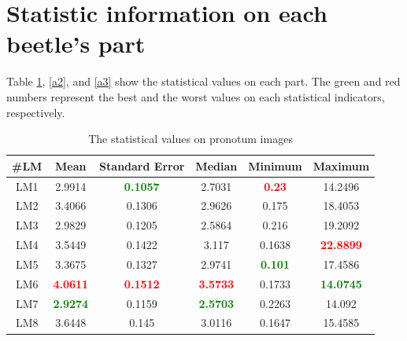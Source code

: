 \documentclass[review]{elsarticle}
\begin{document}
\section{Statistic information on each beetle's part}
\label{appdixA}
Table \ref{a1}, \ref{a2}, and \ref{a3} show the statistical values on each part. The green and red numbers represent the best and the worst values on each statistical indicators, respectively.  
\begin{table}[htbp]
\begin{tabular}{ | c | c | c | c | c | c | }
\hline
	\textbf{\#LM} & \textbf{Mean} & \textbf{Standard Error} & \textbf{Median} & \textbf{Minimum} & \textbf{Maximum} \\ \hline
	LM1 & 2.9914 & \textcolor{green}{\textbf{0.1057}} & 2.7031 & \textcolor{red}{\textbf{0.23}} & 14.2496 \\ \hline
	LM2 & 3.4066 & 0.1306 & 2.9626 & 0.175 & 18.4053 \\ \hline
	LM3 & 2.9829 & 0.1205 & 2.5864 & 0.216 & 19.2092 \\ \hline
	LM4 & 3.5449 & 0.1422 & 3.117 & 0.1638 & \textcolor{red}{\textbf{22.8899}} \\ \hline
	LM5 & 3.3675 & 0.1327 & 2.9741 & \textcolor{green}{\textbf{0.101}} & 17.4586 \\ \hline
	LM6 & \textcolor{red}{\textbf{4.0611}} & \textcolor{red}{\textbf{0.1512}} & \textcolor{red}{\textbf{3.5733}} & 0.1733 & \textcolor{green}{\textbf{14.0745}} \\ \hline
	LM7 & \textcolor{green}{\textbf{2.9274}} & 0.1159 & \textcolor{green}{\textbf{2.5703}} & 0.2263 & 14.092 \\ \hline
	LM8 & 3.6448 & 0.145 & 3.0116 & 0.1647 & 15.4585 \\ \hline
\end{tabular}
\caption{The statistical values on pronotum images}
\label{a1}
\end{table}
\end{document}
